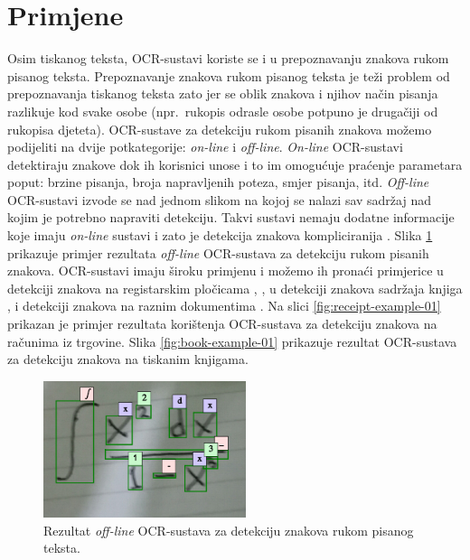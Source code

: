 \documentclass[times, utf8, zavrsni]{fer}
\begin{document}
\section{Primjene}
Osim tiskanog teksta, OCR-sustavi koriste se i u prepoznavanju znakova rukom
pisanog teksta. Prepoznavanje znakova rukom pisanog teksta je teži problem od
prepoznavanja tiskanog teksta \citep{DBLP:journals/corr/abs-1710-05703} zato jer
se oblik znakova i njihov način pisanja razlikuje kod svake osobe (npr.\
rukopis odrasle osobe potpuno je drugačiji od rukopisa djeteta).
OCR-sustave za detekciju rukom pisanih znakova možemo podijeliti na dvije
potkategorije: \emph{on-line} i \emph{off-line}. \emph{On-line} OCR-sustavi
detektiraju znakove dok ih korisnici unose i to im omogućuje praćenje
parametara poput: brzine pisanja, broja napravljenih poteza,
smjer pisanja, itd. \emph{Off-line} OCR-sustavi izvode se nad jednom slikom na
kojoj se nalazi sav sadržaj nad kojim je potrebno napraviti detekciju. Takvi
sustavi nemaju dodatne informacije koje imaju \emph{on-line} sustavi i zato je
detekcija znakova kompliciranija \citep{DBLP:journals/corr/abs-1710-05703}.
Slika \ref{fig:math-example-01} prikazuje primjer rezultata \emph{off-line}
OCR-sustava za detekciju rukom pisanih znakova. OCR-sustavi imaju široku
primjenu i možemo ih pronaći primjerice u detekciji znakova na registarskim
pločicama \citep{DBLP:journals/corr/Saghaei16a},
\citep{DBLP:journals/corr/abs-1802-09567}, u detekciji znakova sadržaja knjiga
\citep{DBLP:journals/corr/abs-1802-10033},
\citep{Christy:2017:MDE:3172938.3075645} i detekciji znakova na raznim
dokumentima \citep{DBLP:journals/corr/HarrajR15} \citep{verma2016ocr}. Na
slici \ref{fig:receipt-example-01} prikazan je primjer rezultata korištenja
OCR-sustava za detekciju znakova na računima iz trgovine. Slika
\ref{fig:book-example-01} prikazuje rezultat OCR-sustava za detekciju znakova
na tiskanim knjigama.

\pagebreak

\begin{figure}[htb]
    \centering
    \captionsetup{justification=centering,margin=2cm}
    \includegraphics[height=4cm]{images/math-example-01.png}
    \caption{
        Rezultat \emph{off-line} OCR-sustava za detekciju znakova rukom pisanog
        teksta.
    }
    \label{fig:math-example-01}
\end{figure}
\end{document}
